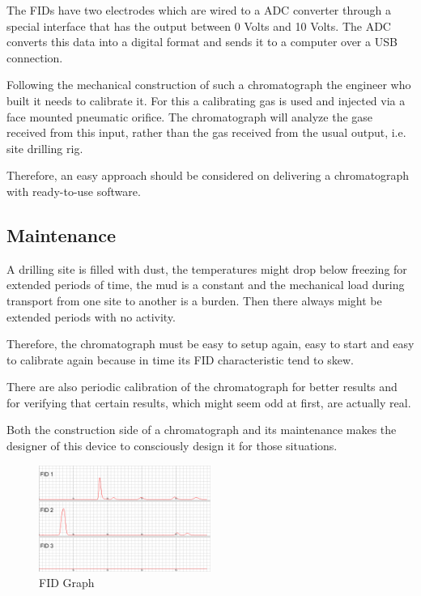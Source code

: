 \documentclass[conference]{IEEEtran}
\begin{document}
    The FIDs have two electrodes which are wired to a ADC converter through a special interface that has the output between
    0 Volts and 10 Volts. The ADC converts this data into a digital format and sends it to a computer over a USB connection.

    Following the mechanical construction of such a chromatograph the engineer who built it needs to calibrate it. For this
    a calibrating gas is used and injected via a face mounted pneumatic orifice. The chromatograph will analyze the gase received
    from this input, rather than the gas received from the usual output, i.e. site drilling rig.
    
    Therefore, an easy approach should be considered on delivering a chromatograph with ready-to-use software.
    
\subsection{Maintenance}

    A drilling site is filled with dust, the temperatures might drop below freezing for extended periods of time, the mud is
    a constant and the mechanical load during transport from one site to another is a burden. Then there always might be extended
    periods with no activity. 

    Therefore, the chromatograph must be easy to setup again, easy to start and easy to calibrate again because in time its 
    FID characteristic tend to skew.

    There are also periodic calibration of the chromatograph for better results and for verifying that certain results, which
    might seem odd at first, are actually real.

    Both the construction side of a chromatograph and its maintenance makes the designer of this device to consciously design
    it for those situations.

    \begin{figure}
        \centering
        \includegraphics[width=0.5\textwidth]{fidgraph.png}
        \caption{FID Graph}
        \label{fig:fidgraph}
    \end{figure}
\end{document}
